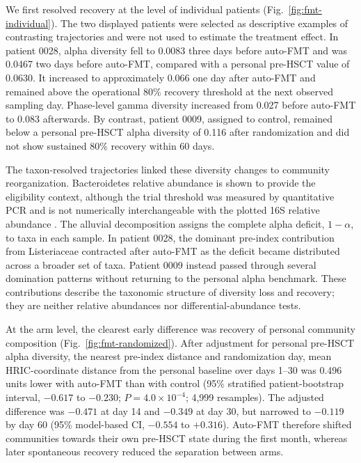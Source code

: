 We first resolved recovery at the level of individual patients
(Fig.~\ref{fig:fmt-individual}). The two displayed patients were selected as
descriptive examples of contrasting trajectories and were not used to estimate
the treatment effect. In patient 0028, alpha diversity fell to 0.0083 three
days before auto-FMT and was 0.0467 two days before auto-FMT, compared with a
personal pre-HSCT value of 0.0630. It increased to approximately 0.066 one day
after auto-FMT and remained above the operational 80\% recovery threshold at
the next observed sampling day. Phase-level gamma diversity increased from
0.027 before auto-FMT to 0.083 afterwards. By contrast, patient 0009, assigned
to control, remained below a personal pre-HSCT alpha diversity of 0.116 after
randomization and did not show sustained 80\% recovery within 60 days.

The taxon-resolved trajectories linked these diversity changes to community
reorganization. Bacteroidetes relative abundance is shown to provide the
eligibility context, although the trial threshold was measured by quantitative
PCR and is not numerically interchangeable with the plotted 16S relative
abundance \cite{taur2018reconstitution}. The alluvial decomposition assigns the
complete alpha deficit, $1-\alpha$, to taxa in each sample. In patient 0028,
the dominant pre-index contribution from Listeriaceae contracted after
auto-FMT as the deficit became distributed across a broader set of taxa.
Patient 0009 instead passed through several domination patterns without
returning to the personal alpha benchmark. These contributions describe the
taxonomic structure of diversity loss and recovery; they are neither relative
abundances nor differential-abundance tests.

At the arm level, the clearest early difference was recovery of personal
community composition (Fig.~\ref{fig:fmt-randomized}). After adjustment for
personal pre-HSCT alpha diversity, the nearest pre-index distance and
randomization day, mean HRIC-coordinate distance from the personal baseline
over days 1--30 was 0.496 units lower with auto-FMT than with control (95\%
stratified patient-bootstrap interval, $-0.617$ to $-0.230$;
$P=4.0\times10^{-4}$; 4,999 resamples). The adjusted difference was $-0.471$
at day 14 and $-0.349$ at day 30, but narrowed to $-0.119$ by day 60 (95\%
model-based CI, $-0.554$ to $+0.316$). Auto-FMT therefore shifted communities
towards their own pre-HSCT state during the first month, whereas later
spontaneous recovery reduced the separation between arms.

